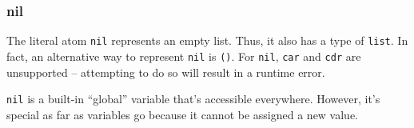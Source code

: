 \subsubsection{nil}
The literal atom \texttt{nil} represents an empty list. Thus, it also has a type of \texttt{list}. In fact, an alternative way to represent \texttt{nil} is \texttt{()}. For \texttt{nil}, \texttt{car} and \texttt{cdr} are unsupported -- attempting to do so will result in a runtime error.

\texttt{nil} is a built-in ``global'' variable that's accessible everywhere. However, it's special as far as variables go because it cannot be assigned a new value.
